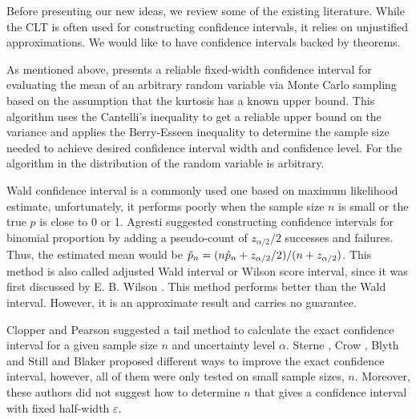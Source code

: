 \documentclass{iitthesis}
\begin{document}
Before presenting our new ideas, we review some of the existing literature.  While the CLT is often used for constructing confidence intervals, it relies on unjustified approximations.  We would like to have confidence intervals backed by theorems.

As mentioned above, \cite{HJLO12} presents a  reliable fixed-width confidence interval for evaluating the mean of an arbitrary random variable via Monte Carlo sampling based on the assumption that the kurtosis has a known upper bound. This algorithm uses the Cantelli's inequality to get a reliable upper bound on the variance and applies the Berry-Esseen inequality to determine the sample size needed to achieve desired confidence interval width and confidence level. For the algorithm in \cite{HJLO12} the distribution of the random variable is arbitrary. 

Wald confidence interval \cite[Section 1.3.3]{Agresti02} is a commonly used one based on maximum likelihood estimate, unfortunately, it performs poorly when the sample size $n$ is small or the true $p$ is close to 0 or 1. Agresti \cite[Section 1.4.2]{Agresti02} suggested constructing confidence intervals for binomial proportion by adding a pseudo-count of $z_{\alpha/2}/2$ successes and failures.  Thus, the estimated mean would be $\tilde{p}_n =(n\hat{p}_n+z_{\alpha/2}/2) / (n+z_{\alpha/2})$. This method is also called adjusted Wald interval or Wilson score interval, since it was first discussed by E. B. Wilson \cite{wilson27}. This method performs better than the Wald interval.  However, it is an approximate result and carries no guarantee.

Clopper and Pearson \cite{CP34} suggested a tail method to calculate the exact confidence interval for a given sample size $n$ and uncertainty level $\alpha$. Sterne \cite{sterne54}, Crow \cite{crow56}, Blyth and Still \cite{BS83} and Blaker \cite{Blaker00} proposed different ways to improve the exact confidence interval, however, all of them were only tested on small sample sizes, $n$.  Moreover, these authors did not suggest how to determine $n$ that gives a confidence interval with fixed half-width $\varepsilon$. 
\end{document}
